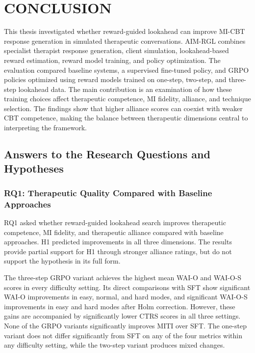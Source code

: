 \setlength{\footskip}{8mm}

\chapter{CONCLUSION}

This thesis investigated whether reward-guided lookahead can improve MI-CBT response generation in simulated therapeutic conversations. AIM-RGL combines specialist therapist response generation, client simulation, lookahead-based reward estimation, reward model training, and policy optimization. The evaluation compared baseline systems, a supervised fine-tuned policy, and GRPO policies optimized using reward models trained on one-step, two-step, and three-step lookahead data. The main contribution is an examination of how these training choices affect therapeutic competence, MI fidelity, alliance, and technique selection. The findings show that higher alliance scores can coexist with weaker CBT competence, making the balance between therapeutic dimensions central to interpreting the framework.

\section{Answers to the Research Questions and Hypotheses}

\subsection{RQ1: Therapeutic Quality Compared with Baseline Approaches}

RQ1 asked whether reward-guided lookahead search improves therapeutic competence, MI fidelity, and therapeutic alliance compared with baseline approaches. H1 predicted improvements in all three dimensions. The results provide partial support for H1 through stronger alliance ratings, but do not support the hypothesis in its full form.

The three-step GRPO variant achieves the highest mean WAI-O and WAI-O-S scores in every difficulty setting. Its direct comparisons with SFT show significant WAI-O improvements in easy, normal, and hard modes, and significant WAI-O-S improvements in easy and hard modes after Holm correction. However, these gains are accompanied by significantly lower CTRS scores in all three settings. None of the GRPO variants significantly improves MITI over SFT. The one-step variant does not differ significantly from SFT on any of the four metrics within any difficulty setting, while the two-step variant produces mixed changes.

